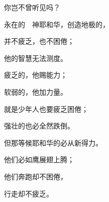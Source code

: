 {\par }{\Q 你岂不曾听见吗？
\par }{\Q 永在的　神耶和华，创造地极的{}，
\par }{\Q 并不疲乏，也不困倦；
\par }{\Q 他的智慧无法测度。
\par }{\Q {}疲乏的，他赐能力；
\par }{\Q 软弱的，他加力量。
\par }{\Q {}就是少年人也要疲乏困倦；
\par }{\Q 强壮的也必全然跌倒。
\par }{\Q {}但那等候耶和华的必从新得力。
\par }{\Q 他们必如鹰展翅上腾；
\par }{\Q 他们奔跑却不困倦，
\par }{\Q 行走却不疲乏。

}
